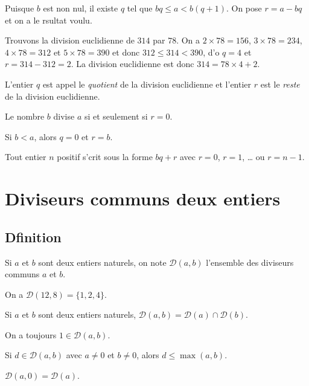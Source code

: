\documentclass[a4paper,fleqn,openany]{trmbook}
\newcommand*{\ensdiv}[1]{\mathcal{D}(#1)}
\newcommand*{\ens}[1]{\{#1\}}
\newcommand*{\definir}[1]{\emph{#1}}
\begin{document}
\begin{demonstration}
Puisque $b$ est non nul, il existe $q$ tel que $bq \leq a < b(q+1)$. On pose $r = a-bq$ et on a le rsultat voulu.
\end{demonstration}

\begin{exemple}
Trouvons la division euclidienne de $314$ par $78$. On a $2 \times 78 = 156$, $3 \times 78 = 234$, $4 \times 78 = 312$ et $5 \times 78 = 390$ et donc $312 \leq 314 < 390$, d'o $q = 4$ et $r = 314-312 = 2$. La division euclidienne est donc $314 = 78 \times 4 + 2$.
\end{exemple}

\begin{definition}
L'entier $q$ est appel le \definir{quotient} de la division euclidienne et l'entier $r$ est le \definir{reste} de la division euclidienne.
\end{definition}

\begin{proprietes}
\begin{sousproprietes}
    \item Le nombre $b$ divise $a$ si et seulement si $r=0$.
    \item Si $b < a$, alors $q=0$ et $r=b$.
    \item Tout entier $n$ positif s'crit sous la forme $bq+r$ avec $r=0$, $r=1$, \dots{} ou $r=n-1$.
\end{sousproprietes}
\end{proprietes}

\section{Diviseurs communs  deux entiers}

\subsection{Dfinition}

\begin{definition}
Si $a$ et $b$ sont deux entiers naturels, on note $\ensdiv{a,b}$ l'ensemble des diviseurs communs  $a$ et $b$.
\end{definition}

\begin{exemple}
On a $\ensdiv{12,8} = \ens{1,2,4}$.
\end{exemple}

\begin{proprietes}\label{ref:propr:ensdiv.commun}
\begin{sousproprietes}
    \item Si $a$ et $b$ sont deux entiers naturels, $\ensdiv{a,b} = \ensdiv{a} \cap \ensdiv{b}$.
    \item On a toujours $1 \in \ensdiv{a,b}$.
    \item Si $d \in \ensdiv{a,b}$ avec $a \neq 0$ et $b \neq 0$, alors $d \leq \max(a,b)$.
    \item $\ensdiv{a,0} = \ensdiv{a}$.
\end{sousproprietes}
\end{proprietes}
\end{document}
